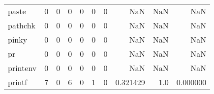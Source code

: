 \begin{longtable}{lrrrrrrrrr}
paste     &                                                  0 &                                                  0 &                                                  0 &                                                  0 &                                                  0 &                                                  0 &                                                NaN &                                    NaN &                                  NaN \\
pathchk   &                                                  0 &                                                  0 &                                                  0 &                                                  0 &                                                  0 &                                                  0 &                                                NaN &                                    NaN &                                  NaN \\
pinky     &                                                  0 &                                                  0 &                                                  0 &                                                  0 &                                                  0 &                                                  0 &                                                NaN &                                    NaN &                                  NaN \\
pr        &                                                  0 &                                                  0 &                                                  0 &                                                  0 &                                                  0 &                                                  0 &                                                NaN &                                    NaN &                                  NaN \\
printenv  &                                                  0 &                                                  0 &                                                  0 &                                                  0 &                                                  0 &                                                  0 &                                                NaN &                                    NaN &                                  NaN \\
printf    &                                                  7 &                                                  0 &                                                  6 &                                                  0 &                                                  1 &                                                  0 &                                           0.321429 &                                    1.0 &                             0.000000 \\

\end{longtable}
